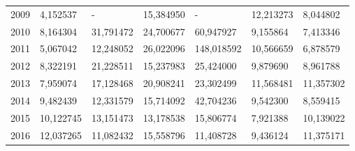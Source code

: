 \begin{table}
\begin{tabular}{p{1cm}p{2cm}p{2cm}p{2cm}p{2cm}p{2cm}p{2cm}}
 2009 &                                           4,152537 &                                   - &                           15,384950 &                        - &                      12,213273 &  8,044802 \\
 2010 &                                           8,164304 &                           31,791472 &                           24,700677 &                60,947927 &                       9,155864 &  7,413346 \\
 2011 &                                           5,067042 &                           12,248052 &                           26,022096 &               148,018592 &                      10,566659 &  6,878579 \\
 2012 &                                           8,322191 &                           21,228511 &                           15,237983 &                25,424000 &                       9,879690 &  8,961788 \\
 2013 &                                           7,959074 &                           17,128468 &                           20,908241 &                23,302499 &                      11,568481 & 11,357302 \\
 2014 &                                           9,482439 &                           12,331579 &                           15,714092 &                42,704236 &                       9,542300 &  8,559415 \\
 2015 &                                          10,122745 &                           13,151473 &                           13,178538 &                15,806774 &                       7,921388 & 10,139022 \\
 2016 &                                          12,037265 &                           11,082432 &                           15,558796 &                11,408728 &                       9,436124 & 11,375171 \\
\bottomrule
\end{tabular}
\end{table}
